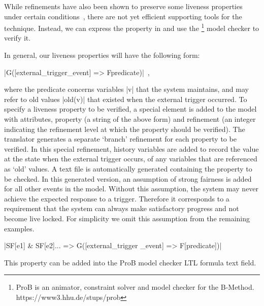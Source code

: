 While \EventB refinements have also been shown to preserve some liveness properties under certain conditions~\cite{hoang2016ltl}, there are not yet efficient supporting tools for the technique.%
Instead, we can express the property in \LTL  and use the \PROB\footnote{ProB is an animator, constraint solver and model checker for the B-Method. https://www3.hhu.de/stups/prob} model checker to verify it.

In general, our liveness properties will have the following form:
\begin{center}
  |G([external_trigger_event] => F{predicate})|~,
\end{center}
where the predicate concerns variables |v| that the system maintains, and may refer to old values |old(v)| that existed when the external trigger occurred.
To specify a liveness property to be verified, a special \LTL element is added to the \SCXML model with attributes, property (a string of the above form)  and refinement (an integer indicating the refinement level at which the property should be verified).
The translator generates a separate `branch' refinement for each \LTL property to be verified. 
In this special refinement, history variables are added to record the value at the state when the external trigger occurs, of any variables that are referenced as `old' values.
A text file is automatically generated containing the \LTL property to be checked. 
In this generated version, an assumption of strong fairness is added for all other events in the model.
Without this assumption, the system may never achieve the expected response to a trigger. 
Therefore it corresponds to a requirement that the system can always make satisfactory progress and not become live locked.
For simplicity we omit this assumption from the remaining examples.
\begin{center}
  |SF[e1] & SF[e2]... => G([external_trigger _event] => F[predicate])|
\end{center}
This property can be added into the ProB model checker LTL formula text field.

